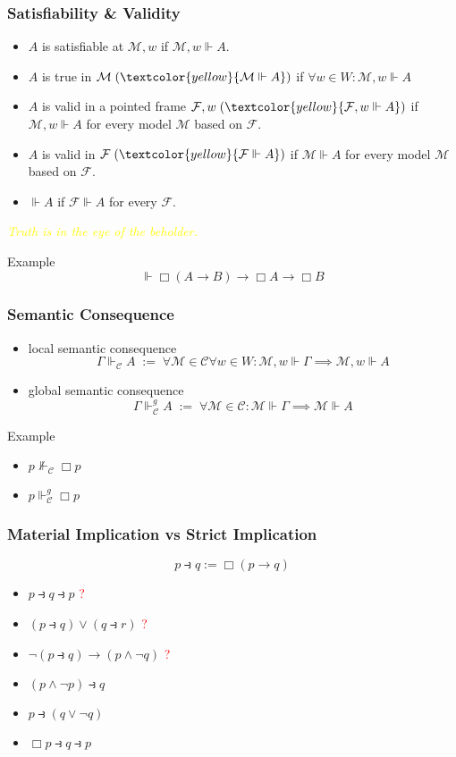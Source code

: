 \documentclass[UTF8,aspectratio=43,11pt,colorlinks,compress,openany]{beamer}%
\begin{document}
\begin{frame}\frametitle{Satisfiability \& Validity}
	\begin{itemize}
		\item $A$ is satisfiable at $\mathcal{M},w$ if $\mathcal{M},w\Vdash A$.
		\item $A$ is true in $\mathcal{M}\;(\textcolor{yellow}{\mathcal{M}\Vdash A})$ if $\forall w\in W: \mathcal{M},w\Vdash A$
		\item $A$ is valid in a pointed frame $\mathcal{F},w\;(\textcolor{yellow}{\mathcal{F},w\Vdash A})$ if $\mathcal{M},w\Vdash A$ for every model $\mathcal{M}$ based on $\mathcal{F}$.
		\item $A$ is valid in $\mathcal{F}\;(\textcolor{yellow}{\mathcal{F}\Vdash A})$ if $\mathcal{M}\Vdash A$ for every model $\mathcal{M}$ based on $\mathcal{F}$.
		\item $\Vdash A$ if $\mathcal{F}\Vdash A$ for every $\mathcal{F}$.
	\end{itemize}
\centering\textcolor{yellow}{\emph{Truth is in the eye of the beholder.}}
\setlength\abovedisplayskip{0pt}
	\begin{block}{Example}
		\[\Vdash\Box(A\to B)\to\Box A\to\Box B\]
	\end{block}
\end{frame}

\begin{frame}\frametitle{Semantic Consequence}
	\begin{itemize}
		\item local semantic consequence
		\[\Gamma\Vdash_{\mathcal{C}} A\;:=\;\forall \mathcal{M}\in\mathcal{C}\forall w\in W:\mathcal{M},w\Vdash\Gamma\implies\mathcal{M},w\Vdash A\]
		\item global semantic consequence
		\[\Gamma\Vdash_{\mathcal{C}}^g A\;:=\;\forall \mathcal{M}\in\mathcal{C}: \mathcal{M}\Vdash\Gamma\implies\mathcal{M}\Vdash A\]
	\end{itemize}
	\begin{block}{Example}
		\begin{itemize}
			\item $p\nVdash_{\mathcal{C}}\Box p$
			\item $p\Vdash_{\mathcal{C}}^g\Box p$
		\end{itemize}
	\end{block}
\end{frame}

\begin{frame}\frametitle{Material Implication vs Strict Implication}
\[p\strictif q := \Box(p\to q)\]
\begin{itemize}
	\item $p\strictif q\strictif p$ \textcolor{red}{?}
	\item $(p\strictif q)\vee(q\strictif r)$ \textcolor{red}{?}
	\item $\neg(p\strictif q)\to(p\wedge\neg q)$ \textcolor{red}{?}
	\item $(p\wedge\neg p)\strictif q$
	\item $p\strictif(q\vee\neg q)$
	\item $\Box p\strictif q\strictif p$
\end{itemize}
\end{frame}
\end{document}
